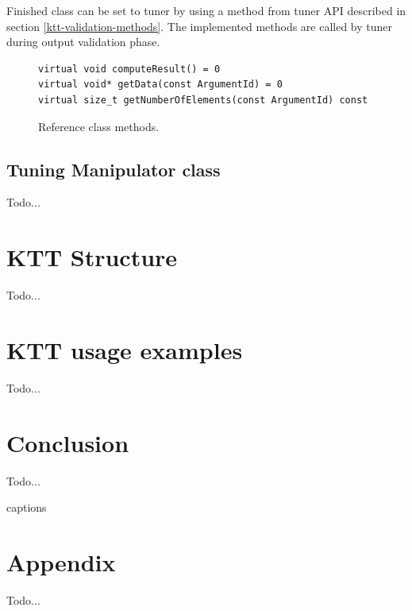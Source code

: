 \documentclass
[
    digital, %
    oneside, %
    table, %
    nolof, %
    nolot, %
    nocover %
]{fithesis3}
\begin{document}
Finished class can be set to tuner by using a method from tuner API described in section \ref{ktt-validation-methods}. The implemented methods are
called by tuner during output validation phase.

\begin{figure}
\begin{lstlisting}
virtual void computeResult() = 0
virtual void* getData(const ArgumentId) = 0
virtual size_t getNumberOfElements(const ArgumentId) const
\end{lstlisting}
\caption{Reference class methods.}
\label{ktt-reference-methods}
\end{figure}

\section{Tuning Manipulator class}
Todo...

\chapter{KTT Structure}
\label{ktt-structure}
Todo...

\chapter{KTT usage examples}
\label{ktt-usage}
Todo...

\chapter{Conclusion}
Todo...

\csname captions\languagename\endcsname
\makeatletter
\thesis@selectLocale{\thesis@locale}\makeatother
\printbibliography[heading=bibintoc]

\appendix
\chapter{Appendix}
Todo...
\end{document}
